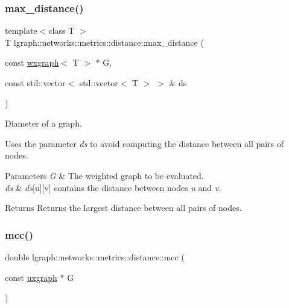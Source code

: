 \subsubsection{\texorpdfstring{max\+\_\+distance()}{max\_distance()}\hspace{0.1cm}{\footnotesize\ttfamily [4/4]}}
{\footnotesize\ttfamily template$<$class T $>$ \\
T lgraph\+::networks\+::metrics\+::distance\+::max\+\_\+distance (\begin{DoxyParamCaption}\item[{const \hyperlink{classlgraph_1_1wxgraph}{wxgraph}$<$ T $>$ $\ast$}]{G,  }\item[{const std\+::vector$<$ std\+::vector$<$ T $>$ $>$ \&}]{ds }\end{DoxyParamCaption})}



Diameter of a graph. 

Uses the parameter {\itshape ds} to avoid computing the distance between all pairs of nodes.


\begin{DoxyParams}{Parameters}
{\em G} & The weighted graph to be evaluated. \\
\hline
{\em ds} & {\itshape ds}\mbox{[}u\mbox{]}\mbox{[}v\mbox{]} contains the distance between nodes {\itshape u} and {\itshape v}. \\
\hline
\end{DoxyParams}
\begin{DoxyReturn}{Returns}
Returns the largest distance between all pairs of nodes. 
\end{DoxyReturn}
\mbox{\label{namespacelgraph_1_1networks_1_1metrics_1_1distance_a29f1194ca5bd104ae062792a6df1c401}} 
\subsubsection{\texorpdfstring{mcc()}{mcc()}\hspace{0.1cm}{\footnotesize\ttfamily [1/4]}}
{\footnotesize\ttfamily double lgraph\+::networks\+::metrics\+::distance\+::mcc (\begin{DoxyParamCaption}\item[{const \hyperlink{classlgraph_1_1uxgraph}{uxgraph} $\ast$}]{G }\end{DoxyParamCaption})}



